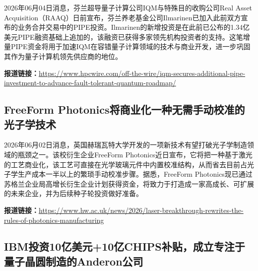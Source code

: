 \documentclass[12pt,a4paper]{ctexart}
\begin{document}
2026年06月04日消息，芬兰超导量子计算公司IQM与特殊目的收购公司Real Asset Acquisition（RAAQ）日前宣布，芬兰养老基金公司Ilmarinen已加入此前双方宣布的业务合并交易中的PIPE投资。Ilmarinen的新增投资是在此前已公布的1.34亿美元PIPE融资基础上追加的，该融资已获得多家领先机构投资者的支持。这笔增量PIPE资金将用于加速IQM在容错量子计算领域的技术与商业开发，进一步巩固其作为量子计算机领先供应商的地位。

\noindent\textbf{报道链接：}\url{https://www.hpcwire.com/off-the-wire/iqm-secures-additional-pipe-investment-to-advance-fault-tolerant-quantum-roadmap/}

\subsection{ FreeForm Photonics将商业化一种无需手动校准的光子学技术 }

2026年06月02日消息，英国赫瑞瓦特大学开发的一项新技术有望打破光子学制造领域的瓶颈之一。该校衍生企业FreeForm Photonics近日宣布，它将把一种基于激光的工艺商业化，该工艺可直接在光学玻璃元件中内置校准结构，从而省去目前占光子学生产成本一半以上的繁琐手动校准步骤。据悉，FreeForm Photonics现已通过苏格兰企业局高增长衍生企业计划获得资金，将致力于打造成一家高成长、可扩展的未来企业，并为后续种子轮投资做好准备。

\noindent\textbf{报道链接：}\url{https://www.hw.ac.uk/news/2026/laser-breakthrough-rewrites-the-rules-of-photonics-manufacturing}

\subsection{ IBM投资10亿美元+10亿CHIPS补贴，成立专注于量子晶圆制造的Anderon公司 }
\end{document}
